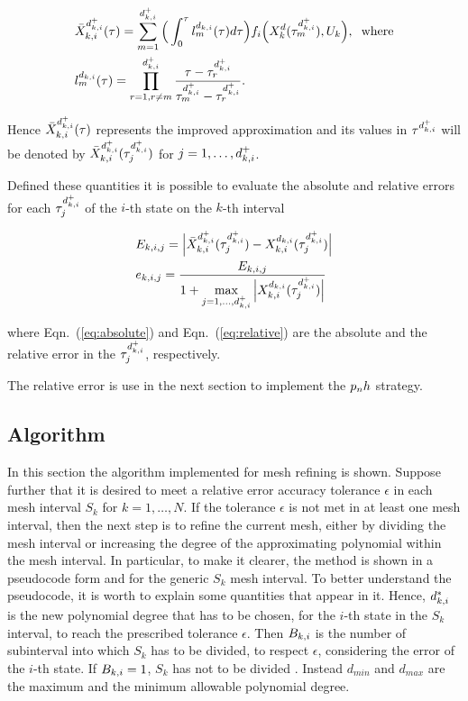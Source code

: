\begin{subequations}
\begin{align}
	&\bar{X}_{k,i}^{d_{k,i}^{+}} (\tau) = \sum_{m=1}^{d_{k,i}^{+}}\Big(\int_{0}^{\tau}l_{m}^{d_{k,i}} (\tau)d\tau\Big) f_i\Big(X_{k}^{d}(\tau^{{d}_{k,i}^{+}}_m), U_k\Big), \hspace{2mm} \text{where} \label{eq:barX}\\
	&  l_{m}^{d_{k,i}} (\tau) = \prod_{r=1, r\neq m}^{d_{k,i}^{+}} \dfrac{\tau - \tau^{{d}_{k,i}^{+}}_r}{\tau^{{d}_{k,i}^{+}}_m - \tau^{{d}_{k,i}^{+}}_r}. \label{eq:meshlm}
\end{align}

\end{subequations}

Hence $\bar{X}_{k,i}^{d_{k,i}^{+}} (\tau)$ represents the improved approximation and its values in $\tau^{{d}_{k,i}^{+}}$ will be denoted by $\bar{X}_{k,i}^{d_{k,i}^{+}} (\tau^{{d}_{k,i}^{+}}_j)$ for $j = 1, \dots, d_{k,i}^{+}$.

Defined these quantities it is possible to evaluate the absolute and relative errors for each $\tau^{{d}_{k,i}^{+}}_j$ of the $i$-th state on the $k$-th interval

\begin{subequations}
	\begin{align}
	&E_{k,i,j} = \Big|\bar{X}_{k,i}^{d_{k,i}^{+}} (\tau^{{d}_{k,i}^{+}}_j) - X_{k,i}^{d_{k,i}} (\tau^{{d}_{k,i}^{+}}_j)\Big| \label{eq:absolute}\\
	&e_{k,i,j} = \dfrac{E_{k,i,j}}{1 + \max\limits_{j= 1, \dots, d_{k,i}^{+}} \Big| X_{k,i}^{d_{k,i}} (\tau^{{d}_{k,i}^{+}}_j)\Big|} \label{eq:relative} 
	\end{align}
\end{subequations}

where Eqn.~(\ref{eq:absolute}) and Eqn.~(\ref{eq:relative}) are the absolute and the relative error in the $\tau^{{d}_{k,i}^{+}}_j$, respectively.

The relative error is use in the next section to implement the $p_{n}h$ strategy.

\subsection*{Algorithm}
In this section the algorithm implemented for mesh refining is shown. 
Suppose further that it is desired to meet a relative error accuracy tolerance $\epsilon$ in each mesh
interval $S_k$ for $k = 1, \dots, N$. If the tolerance  $\epsilon$  is not met in at least one mesh interval, then the next step is to refine the current mesh, either by dividing the mesh interval or increasing the degree of the approximating polynomial within the mesh interval.
In particular, to make it clearer, the method is shown in a pseudocode form and for the generic $S_k$ mesh interval.
To better understand the pseudocode, it is worth to explain some quantities that appear in it.
Hence, $d_{k,i}^{*}$ is the new polynomial degree that has to be chosen, for the $i$-th state in the $S_k$ interval, to reach the prescribed tolerance $\epsilon$. Then $B_{k,i}$ is the number of subinterval into which $S_k$ has to be divided, to respect $\epsilon$, considering the error of the $i$-th state. If $B_{k,i} = 1$, $S_k$ has not to be divided . Instead $d_{min}$ and $d_{max}$ are the maximum and the minimum allowable polynomial degree.


